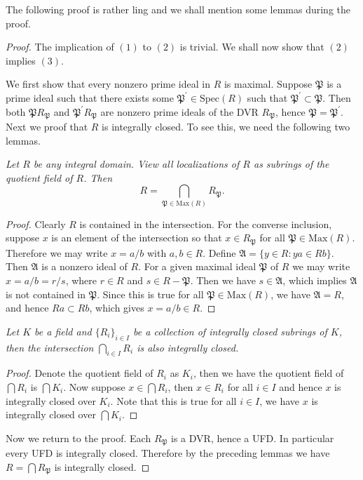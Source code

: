 The following proof is rather ling and we shall mention some lemmas during the proof.
\begin{proof}
The implication of $(1)$ to $(2)$ is trivial. We shall now show that $(2)$ implies $(3)$.\par
We first show that every nonzero prime ideal in $R$ is maximal. Suppose $\mathfrak{P}$ is a prime ideal such that there exists some $\mathfrak{P}^\prime\in\mathrm{Spec}(R)$ such that $\mathfrak{P}^\prime\subset\mathfrak{P}$. Then both $\mathfrak{P}R_\mathfrak{P}$ and $\mathfrak{P}^\prime R_\mathfrak{P}$ are nonzero prime ideals of the DVR $R_\mathfrak{P}$, hence $\mathfrak{P}=\mathfrak{P}^\prime$. Next we proof that $R$ is integrally closed. To see this, we need the following two lemmas.
\begin{lemma}\em\label{LemMaximal}
Let $R$ be any integral domain. View all localizations of $R$ as subrings of the quotient field of $R$. Then 
$$
R=\bigcap_{\mathfrak{P} \in \mathrm{Max}\left( R \right)}{R_{\mathfrak{P}}}.
$$
\end{lemma}
\begin{proof}
Clearly $R$ is contained in the intersection. For the converse inclusion, suppose $x$ is an element of the intersection so that $x\in R_\mathfrak{P}$ for all $\mathfrak{P}\in\mathrm{Max}(R)$. Therefore we may write $x=a/b$ with $a,b\in R$. Define $\mathfrak{A}=\{y\in R:ya\in Rb\}$. Then $\mathfrak{A}$ is a nonzero ideal of $R$. For a given maximal ideal $\mathfrak{P}$ of $R$ we may write $x=a/b=r/s$, where $r\in R$ and $s\in R-\mathfrak{P}$. Then we have $s\in\mathfrak{A}$, which implies $\mathfrak{A}$ is not contained in $\mathfrak{P}$. Since this is true for all $\mathfrak{P}\in\mathrm{Max}(R)$, we have $\mathfrak{A}=R$, and hence $Ra\subset Rb$, which gives $x=a/b\in R$.
\end{proof}
\begin{lemma}\em
Let $K$ be a field and $\{R_i\}_{i\in I}$ be a collection of integrally closed subrings of $K$, then the intersection $\bigcap_{i\in I}R_i$ is also integrally closed.
\end{lemma}
\begin{proof}
Denote the quotient field of $R_i$ as $K_i$, then we have the quotient field of $\bigcap R_i$ is $\bigcap K_i$. Now suppose $x\in\bigcap R_i$, then $x\in R_i$ for all $i\in I$ and hence $x$ is integrally closed over $K_i$. Note that this is true for all $i\in I$, we have $x$ is integrally closed over $\bigcap K_i$.
\end{proof}
Now we return to the proof. Each $R_\mathfrak{P}$ is a DVR, hence a UFD. In particular every UFD is integrally closed. Therefore by the preceding lemmas we have $R=\bigcap R_\mathfrak{P}$ is integrally closed.\par

\end{proof}
